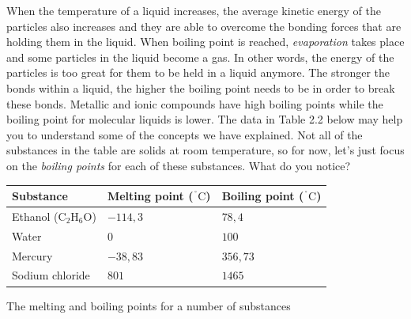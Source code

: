 \begin{enumerate}[noitemsep, label=\textbf{\arabic*}. ]
When the temperature of a liquid increases, the average 
kinetic energy of the particles also increases and they are able to overcome 
the bonding forces that are holding them in the liquid. When boiling point is 
reached, \textsl{evaporation} takes place and some 
particles in the liquid become a gas. In other words, the energy of the 
particles is too great for them to be held in a liquid anymore. The stronger the 
bonds within a liquid, the higher the boiling point needs to be in order to 
break these bonds. Metallic and ionic compounds have high boiling points while 
the boiling point for molecular liquids is lower.
The data in Table 2.2 below may help you to understand some of 
the concepts we have explained. Not all of the substances in the table are 
solids at room temperature, so for now, let's just focus on the \textsl{boiling points} for each of these substances. What do 
you notice?
\begin{table}[H]
 \begin{center}
      \label{m38734*uid45}
\begin{tabular}{|l|l|l|}\hline
\textbf{Substance} & \textbf{Melting point (${}^{\ensuremath{{\,}^{\circ}}}\mathrm{C}$)} & \textbf{Boiling point (${}^{\ensuremath{{\,}^{\circ}}}\mathrm{C}$)} \\ \hline
Ethanol (${\mathrm{C}}_{2}{\mathrm{H}}_{6}\mathrm{O}$) & $-114,3$ & $78,4$ \\ \hline
Water                    & $0$      & $100$  \\ \hline
Mercury                                                & $-38,83$ & $356,73$ \\ \hline
Sodium chloride & $801$ & $1465$ \\ \hline
    \end{tabular}
      \end{center}
    \begin{caption}{The melting and boiling points for a number of substances}\end{caption}
\end{table}


\end{enumerate}
